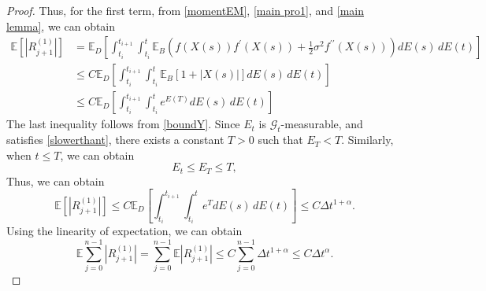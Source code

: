 \documentclass[10pt,reqno,final]{amsart}
\theoremstyle{plain}
\theoremstyle{definition}
\theoremstyle{remark}
\numberwithin{equation}{section}
\numberwithin{figure}{section}
\numberwithin{table}{section}
\begin{document}
\begin{proof}
	Thus, for the first term, from \cref{momentEM}, \cref{main pro1}, and \cref{main lemma}, we can obtain
	\begin{align*}
		\mathbb{E} \left[|R_{j+1}^{(1)}| \right] &= \mathbb{E}_D \left[
		\int_{t_i}^{t_{i+1}} \int_{t_i}^{t}  \mathbb{E}_B \left( f(X(s)) f^{\prime}(X(s)) + \frac{1}{2} \sigma^2 f^{\prime\prime}(X(s)) \right) dE(s) \, dE(t)
		\right] \\
		&\le C\mathbb{E}_D \left[
		\int_{t_i}^{t_{i+1}} \int_{t_i}^{t}  \mathbb{E}_B \left[1+|X(s)| \right] dE(s) \, dE(t)
		\right] \\
		& \le C\mathbb{E}_D \left[
		\int_{t_i}^{t_{i+1}} \int_{t_i}^{t}  e^{E(T)} dE(s) \, dE(t)
		\right]
	\end{align*}
	The last inequality follows from \cref{boundY}. Since \( E_t \) is \( \mathcal{G}_t \)-measurable, and satisfies \cref{slowerthant}, there exists a constant \( T > 0 \) such that \( E_T < T \). Similarly, when \( t \le T \), we can obtain
	\begin{equation}\label{boundE}
		E_t \leq E_T \leq T,
	\end{equation}
	Thus, we can obtain
	\begin{equation*}
		\mathbb{E} \left[|R_{j+1}^{(1)}| \right]  \le C\mathbb{E}_D \left[
		\int_{t_i}^{t_{i+1}} \int_{t_i}^{t}  e^T dE(s) \, dE(t)
		\right] \le C\Delta t^{1+\alpha}.
	\end{equation*}
	Using the linearity of expectation, we can obtain
	\begin{equation}\label{R1}
		\mathbb{E}\sum\limits_{j=0}^{n-1}|R_{j+1}^{(1)}|= \sum\limits_{j=0}^{n-1}\mathbb{E}|R_{j+1}^{(1)}| \leq
		C\sum\limits_{j=0}^{n-1}\Delta t^{1+\alpha} \le C\Delta t^\alpha.
	\end{equation}
	

\end{proof}
\end{document}
